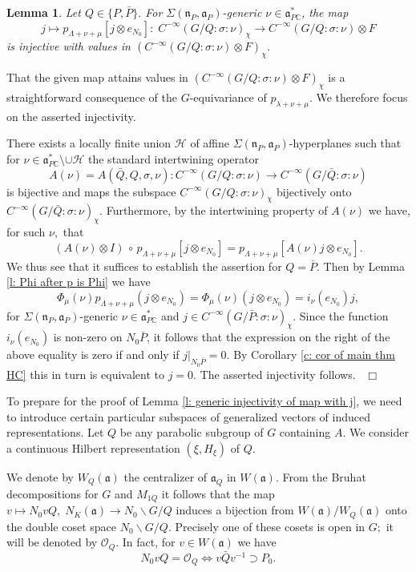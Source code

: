 \documentclass[12pt,a4paper]{article}
\newtheorem{Lemma}[Thm]{Lemma}
\newenvironment{lemma}[0]{\begin{Lemma}\noindent}%
{\end{Lemma}}
\def\proof{\par\noindent{\it Proof.}{\ }{\ }}
\def\qed{~\hfill\hbox{$\Box$}\medbreak}
\def\msy#1{{\mathbb #1}}
\def\C{{\msy C}}
\def\gl{\lambda}
\def\gs{\sigma}
\def\gS{\Sigma}
\def\got#1{\mathfrak #1}
\def\fa{{\got a}}
\def\fn{{\got n}}
\def\to{\rightarrow}
\def\after{\,{\scriptstyle\circ}\,}
\def\iC{{\scriptscriptstyle \C}}
\def\cH{{\mathcal H}}
\def\cO{{\mathcal O}}
\numberwithin{Thm}{section}
\numberwithin{equation}{section}
\def\faPdc{{\fa_{P\iC}^*}}
\def\gL{\Lambda}
\numberwithin{equation}{section}
\def\gL{\Lambda}
\def\faPdc{\fa_{P\iC}^*}
\def\faP{\fa_P}
\def\cchi{\chi}
\def\bfhyp{hyperplanes}
\begin{document}
\begin{lemma}
\label{l: injectivity p after j e}
Let $Q \in \{P, \bar P\}.$ For $\gS(\fn_P,\fa_P)$-generic $\nu \in \faPdc$, the map 
$$
j \mapsto  p_{\gL + \nu + \mu}[j \otimes e_{N_0}] : \;C^{-\infty}(G/Q:\gs:\nu)_\cchi \to C^{-\infty}(G/Q:\gs:\nu) \otimes F
$$  
is injective with values in $( C^{-\infty}(G/Q:\gs:\nu) \otimes F)_\cchi.$ 
\end{lemma}

\proof 
That the given map attains values in $(C^{-\infty}(G/Q:\gs:\nu) \otimes F)_\cchi$ 
is a straightforward consequence of the $G$-equivariance of $p_{\gl + \nu + \mu}.$ 
We therefore focus on the asserted injectivity.

There exists a locally finite union $\cH$ of affine $\gS(\fn_P, \faP)$-{\bfhyp}
such that for $\nu \in \faPdc\setminus \cup \cH$ 
the standard intertwining operator
$$
A(\nu) = A(\bar Q , Q, \gs, \nu): C^{-\infty}(G/Q :\gs:\nu) \to 
C^{-\infty}(G/\bar Q:\gs:\nu)
$$ 
is bijective and    
maps the subspace $C^{-\infty}(G/Q:\gs:\nu)_\cchi$ bijectively onto 
$C^{-\infty}(G/ \bar Q: \gs: \nu)_\cchi.$ 
Furthermore, by the intertwining property of $A(\nu)$ we have, for such $\nu,$ that  
\begin{equation*} 
(A(\nu) \otimes I)\after p_{\gL + \nu + \mu}[j \otimes e_{N_0}] =  
p_{\gL + \nu + \mu} [A(\nu) j \otimes e_{N_0}].
\end{equation*} 
We thus see  that it suffices to establish the assertion for $Q = \bar P.$ 
Then by Lemma \ref{l: Phi after p is Phi} we have 
$$ 
\Phi_\mu(\nu) p_{\gL + \nu + \mu} (j \otimes e_{N_0}) = \Phi_\mu(\nu) ( j \otimes e_{N_0}) = i_\nu(e_{N_0}) j,
$$ 
for $\gS(\fn_P,\fa_P)$-generic $\nu\in \faPdc$ and $j \in C^{-\infty}(G/\bar P: \gs :\nu)_\cchi.$
Since  the function $i_\nu(e_{N_0})$ is non-zero on $N_0 \bar P$, it follows that 
the expression on the right of the above equality is zero if and only if $j|_{N_0 \bar P} = 0.$ 
By Corollary \ref{c: cor of main thm HC} this in turn is  equivalent to $j =0.$ The asserted injectivity follows.
\qed

To prepare for the proof of Lemma \ref{l: generic injectivity of map with j}, we need 
to introduce certain particular subspaces of generalized vectors of induced representations.
Let $Q$ be any parabolic subgroup of $G$ containing $A.$ 
We consider a continuous Hilbert representation $(\xi, H_\xi)$ of $Q.$ 


We denote by $W_Q(\fa)$ the centralizer of $\fa_Q$ in $W(\fa).$
From the Bruhat decompositions for $G$ and $M_{1Q}$ it follows that the map $v \mapsto N_0 v Q, \; N_K(\fa) \to N_0\backslash G / Q$ induces a bijection
from $W(\fa)/W_Q(\fa) $ onto the double coset space $N_0\backslash G / Q.$ 
Precisely one of these cosets is open in $G;$ it will be denoted by $\cO_Q.$ 
In fact, for $v\in W(\fa)$ we have
$$ 
N_0 v Q = \cO_Q\iff v \bar Q v^{-1} \supset P_0.
$$ 
\end{document}
